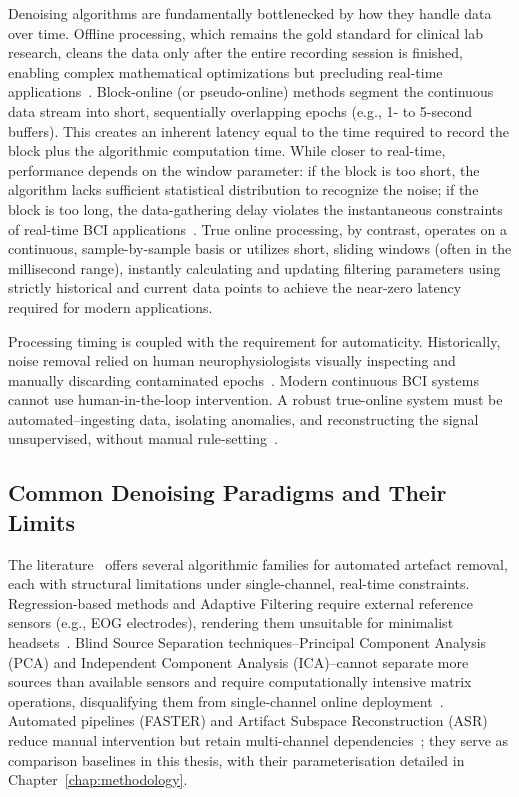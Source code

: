 \documentclass[MScCS,12pt,oneside,final]{uccthesis}
\begin{document}
Denoising algorithms are fundamentally bottlenecked by how they handle data over time. Offline processing, which remains the gold standard for clinical lab research, cleans the data only after the entire recording session is finished, enabling complex mathematical optimizations but precluding real-time applications~\parencite{uriguen2015eeg, mullen2015real}. Block-online (or pseudo-online) methods segment the continuous data stream into short, sequentially overlapping epochs (e.g., 1- to 5-second buffers). This creates an inherent latency equal to the time required to record the block plus the algorithmic computation time. While closer to real-time, performance depends on the window parameter: if the block is too short, the algorithm lacks sufficient statistical distribution to recognize the noise; if the block is too long, the data-gathering delay violates the instantaneous constraints of real-time BCI applications~\parencite{mullen2015real}. True online processing, by contrast, operates on a continuous, sample-by-sample basis or utilizes short, sliding windows (often in the millisecond range), instantly calculating and updating filtering parameters using strictly historical and current data points to achieve the near-zero latency required for modern applications.
        
Processing timing is coupled with the requirement for automaticity. Historically, noise removal relied on human neurophysiologists visually inspecting and manually discarding contaminated epochs~\parencite{uriguen2015eeg}. Modern continuous BCI systems cannot use human-in-the-loop intervention. A robust true-online system must be automated--ingesting data, isolating anomalies, and reconstructing the signal unsupervised, without manual rule-setting~\parencite{jiang2019removal}.
        
\subsection{Common Denoising Paradigms and Their Limits}
\label{subsec:common_paradigms}

The literature~\parencite{uriguen2015eeg} offers several algorithmic families for automated artefact removal, each with structural limitations under single-channel, real-time constraints. Regression-based methods and Adaptive Filtering require external reference sensors (e.g., EOG electrodes), rendering them unsuitable for minimalist headsets~\parencite{croft2000removal, sweeney2012artifact}. Blind Source Separation techniques--Principal Component Analysis (PCA) and Independent Component Analysis (ICA)--cannot separate more sources than available sensors and require computationally intensive matrix operations, disqualifying them from single-channel online deployment~\parencite{makeig1996independent, mullen2015real}. Automated pipelines (FASTER) and Artifact Subspace Reconstruction (ASR) reduce manual intervention but retain multi-channel dependencies~\parencite{nolan2010faster, chang2019evaluation}; they serve as comparison baselines in this thesis, with their parameterisation detailed in Chapter~\ref{chap:methodology}.
\end{document}
